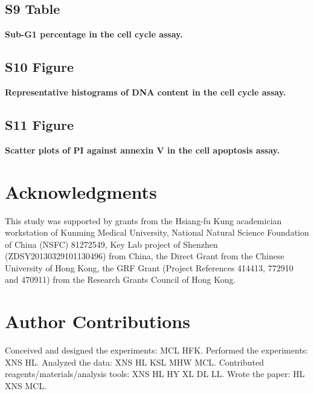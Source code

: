 \documentclass[10pt,letterpaper]{article}
\begin{document}
\subsection*{S9 Table}
\label{S9_Table}
{\bf Sub-G1 percentage in the cell cycle assay.}%

\subsection*{S10 Figure}
\label{S10_Figure}
{\bf Representative histograms of DNA content in the cell cycle assay.}%

\subsection*{S11 Figure}
\label{S11_Figure}
{\bf Scatter plots of PI against annexin V in the cell apoptosis assay.}%

\section*{Acknowledgments}

This study was supported by grants from the Hsiang-fu Kung academician workstation of Kunming Medical University, National Natural Science Foundation of China (NSFC) 81272549, Key Lab project of Shenzhen (ZDSY20130329101130496) from China, the Direct Grant from the Chinese University of Hong Kong, the GRF Grant (Project References 414413, 772910 and 470911) from the Research Grants Council of Hong Kong.

\section*{Author Contributions}

Conceived and designed the experiments: MCL HFK. Performed the experiments: XNS HL. Analyzed the data: XNS HL KSL MHW MCL. Contributed reagents/materials/analysis tools: XNS HL HY XL DL LL. Wrote the paper: HL XNS MCL.

\nolinenumbers

%
%
% 




\end{document}
